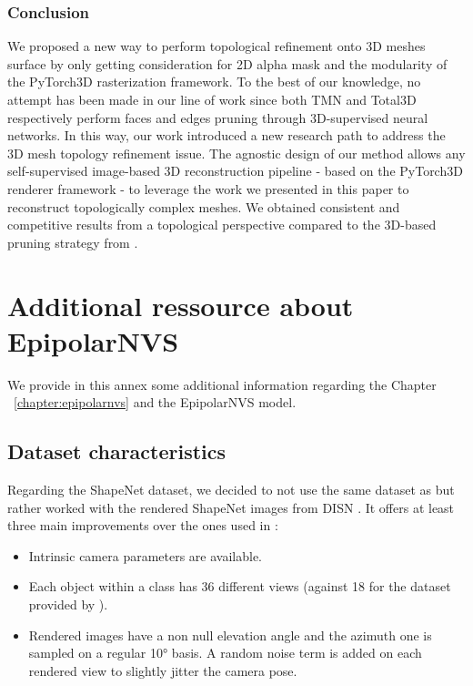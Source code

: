 \subsection{Conclusion}
\label{sec:conclusion}
We proposed a new way to perform topological refinement onto 3D meshes surface by only getting consideration for 2D alpha mask and the modularity of the PyTorch3D rasterization framework. To the best of our knowledge, no attempt has been made in our line of work since both TMN\citep{pan2019deep} and Total3D\citep{nie2020total3dunderstanding} respectively perform faces and edges pruning through 3D-supervised  neural networks. In this way, our work introduced a new research path to address the 3D mesh topology refinement issue. The agnostic design of our method allows any self-supervised image-based 3D reconstruction pipeline - based on the PyTorch3D renderer framework - to leverage the work we presented in this paper to reconstruct topologically complex meshes. We obtained consistent and competitive results from a topological perspective compared to the 3D-based pruning strategy from \citep{pan2019deep}. 



\chapter{Additional ressource about EpipolarNVS}
\label{annex:epipolarnvs}

We provide in this annex some additional information regarding the Chapter ~\ref{chapter:epipolarnvs} and the EpipolarNVS model. 

\section{Dataset characteristics}
\label{annex:epipolarnvs-dataset}

Regarding the ShapeNet dataset, we decided to not use the same dataset as \citep{kim2020novel, sun2018multiview}  but rather worked with the rendered ShapeNet images from DISN \citep{xu2019disn}. It offers at least three main improvements over the ones used in \citep{kim2020novel}:

\begin{itemize}
    \item Intrinsic camera parameters are available. 
    \item Each object within a class has 36 different views (against 18 for the dataset provided by \cite{kim2020novel}). 
    \item Rendered images have a non null elevation angle and the azimuth one is sampled on a regular 10°  basis. A random noise term is added on each rendered view to slightly jitter the camera pose. 
\end{itemize}


